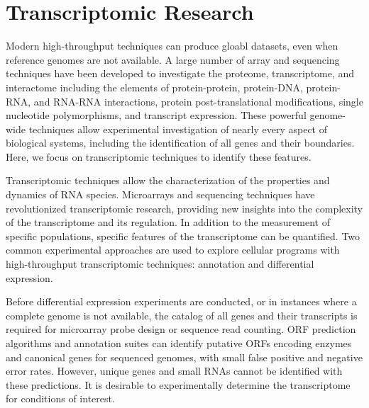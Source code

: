 \section{Transcriptomic Research}
Modern high-throughput techniques can produce gloabl datasets, even when reference genomes are not available.\cite{201} A large number of array and sequencing techniques have been developed to investigate the proteome, transcriptome, and interactome including the elements of protein-protein,\cite{141} protein-DNA,\cite{142,143,144} protein-RNA,\cite{145} and RNA-RNA interactions,\cite{146,147,149} protein post-translational modifications,\cite{149} single nucleotide polymorphisms,\cite{150} and transcript expression.\cite{151,152,153,154} These powerful genome-wide techniques allow experimental investigation of nearly every aspect of biological systems, including the identification of all genes and their boundaries. Here, we focus on transcriptomic techniques to identify these features. 

Transcriptomic techniques allow the characterization of the properties and dynamics of RNA species. Microarrays and sequencing techniques have revolutionized transcriptomic research, providing new insights into the complexity of the transcriptome\cite{152,154,155,156} and its regulation.\cite{157} In addition to the measurement of specific populations\cite{195,196}, specific features of the transcriptome can be quantified.\cite{194} Two common experimental approaches are used to explore cellular programs with high-throughput transcriptomic techniques: annotation and differential expression.

Before differential expression experiments are conducted, or in instances where a complete genome is not available, the catalog of all genes and their transcripts is required for microarray probe design or sequence read counting. ORF prediction algorithms\cite{158,159} and annotation suites\cite{160,161} can identify putative ORFs encoding enzymes and canonical genes for sequenced genomes, with small false positive and negative error rates. However, unique genes and small RNAs cannot be identified with these predictions. It is desirable to experimentally determine the transcriptome for conditions of interest.

